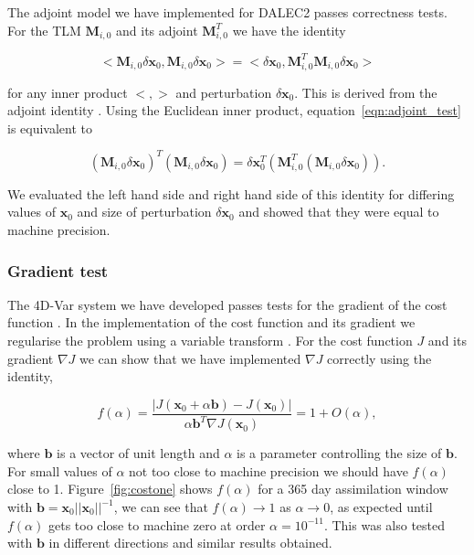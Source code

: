 \documentclass[review]{elsarticle}
\begin{document}
The adjoint model we have implemented for DALEC2 passes correctness tests. For the TLM $\mathbf{M}_{i,0}$ and its adjoint $\mathbf{M}_{i,0}^{T}$ we have the identity
\begin{linenomath}
\begin{equation}
<\mathbf{M}_{i,0}\delta\textbf{x}_0, \mathbf{M}_{i,0}\delta\textbf{x}_0> = <\delta\textbf{x}_0, \mathbf{M}_{i,0}^{T}\mathbf{M}_{i,0}\delta\textbf{x}_0> \label{eqn:adjoint_test}
\end{equation}
\end{linenomath}
for any inner product $<, >$ and perturbation $\delta \textbf{x}_0$. This is derived from the adjoint identity \citep{lawless2013}. Using the Euclidean inner product, equation~\eqref{eqn:adjoint_test} is equivalent to
\begin{linenomath}
\begin{equation}
(\mathbf{M}_{i,0}\delta\textbf{x}_0)^{T} (\mathbf{M}_{i,0}\delta\textbf{x}_0) = \delta\textbf{x}_0^{T} (\mathbf{M}_{i,0}^{T}(\mathbf{M}_{i,0}\delta\textbf{x}_0)).
\end{equation}
\end{linenomath}
We evaluated the left hand side and right hand side of this identity for differing values of $\textbf{x}_0$ and size of perturbation $\delta \textbf{x}_0$ and showed that they were equal to machine precision.

\subsubsection{Gradient test} \label{sec:testgrad}

The 4D-Var system we have developed passes tests for the gradient of the cost function \citep{Navon1992}. In the implementation of the cost function and its gradient we regularise the problem using a variable transform \citep{Freitag2010}. For the cost function $J$ and its gradient $\nabla J$ we can show that we have implemented $\nabla J$ correctly using the identity,
\begin{linenomath}
\begin{equation}
f(\alpha)=\frac{| J( \textbf{x}_0 + \alpha \textbf{b}) - J(\textbf{x}_0) |}{\alpha \textbf{b}^{T} \nabla J(\textbf{x}_0)} = 1 + O(\alpha),
\end{equation}
\end{linenomath}
where $\textbf{b}$ is a vector of unit length and $\alpha$ is a parameter controlling the size of $\textbf{b}$. For small values of $\alpha$ not too close to machine precision we should have $f(\alpha)$ close to 1. Figure~\ref{fig:costone} shows $f(\alpha)$ for a 365 day assimilation window with $\textbf{b}=\textbf{x}_0||\textbf{x}_0||^{-1}$, we can see that $f(\alpha) \rightarrow 1$ as $\alpha \rightarrow 0$, as expected until $f(\alpha)$ gets too close to machine zero at order $\alpha = 10^{-11}$. This was also tested with $\textbf{b}$ in different directions and similar results obtained.
\end{document}
